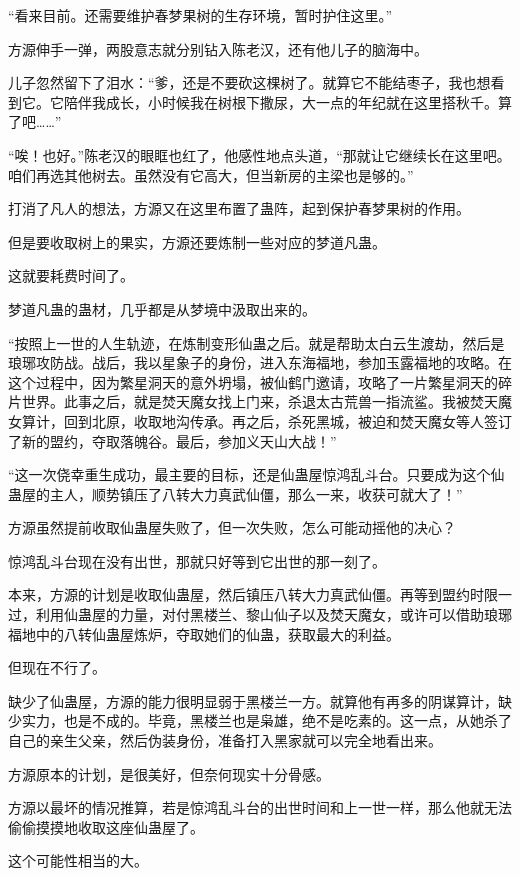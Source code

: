 \begin{this_body}
“看来目前。还需要维护春梦果树的生存环境，暂时护住这里。”

方源伸手一弹，两股意志就分别钻入陈老汉，还有他儿子的脑海中。

儿子忽然留下了泪水：“爹，还是不要砍这棵树了。就算它不能结枣子，我也想看到它。它陪伴我成长，小时候我在树根下撒尿，大一点的年纪就在这里搭秋千。算了吧……”

“唉！也好。”陈老汉的眼眶也红了，他感性地点头道，“那就让它继续长在这里吧。咱们再选其他树去。虽然没有它高大，但当新房的主梁也是够的。”

打消了凡人的想法，方源又在这里布置了蛊阵，起到保护春梦果树的作用。

但是要收取树上的果实，方源还要炼制一些对应的梦道凡蛊。

这就要耗费时间了。

梦道凡蛊的蛊材，几乎都是从梦境中汲取出来的。

“按照上一世的人生轨迹，在炼制变形仙蛊之后。就是帮助太白云生渡劫，然后是琅琊攻防战。战后，我以星象子的身份，进入东海福地，参加玉露福地的攻略。在这个过程中，因为繁星洞天的意外坍塌，被仙鹤门邀请，攻略了一片繁星洞天的碎片世界。此事之后，就是焚天魔女找上门来，杀退太古荒兽一指流鲨。我被焚天魔女算计，回到北原，收取地沟传承。再之后，杀死黑城，被迫和焚天魔女等人签订了新的盟约，夺取落魄谷。最后，参加义天山大战！”

“这一次侥幸重生成功，最主要的目标，还是仙蛊屋惊鸿乱斗台。只要成为这个仙蛊屋的主人，顺势镇压了八转大力真武仙僵，那么一来，收获可就大了！”

方源虽然提前收取仙蛊屋失败了，但一次失败，怎么可能动摇他的决心？

惊鸿乱斗台现在没有出世，那就只好等到它出世的那一刻了。

本来，方源的计划是收取仙蛊屋，然后镇压八转大力真武仙僵。再等到盟约时限一过，利用仙蛊屋的力量，对付黑楼兰、黎山仙子以及焚天魔女，或许可以借助琅琊福地中的八转仙蛊屋炼炉，夺取她们的仙蛊，获取最大的利益。

但现在不行了。

缺少了仙蛊屋，方源的能力很明显弱于黑楼兰一方。就算他有再多的阴谋算计，缺少实力，也是不成的。毕竟，黑楼兰也是枭雄，绝不是吃素的。这一点，从她杀了自己的亲生父亲，然后伪装身份，准备打入黑家就可以完全地看出来。

方源原本的计划，是很美好，但奈何现实十分骨感。

方源以最坏的情况推算，若是惊鸿乱斗台的出世时间和上一世一样，那么他就无法偷偷摸摸地收取这座仙蛊屋了。

这个可能性相当的大。


\end{this_body}

